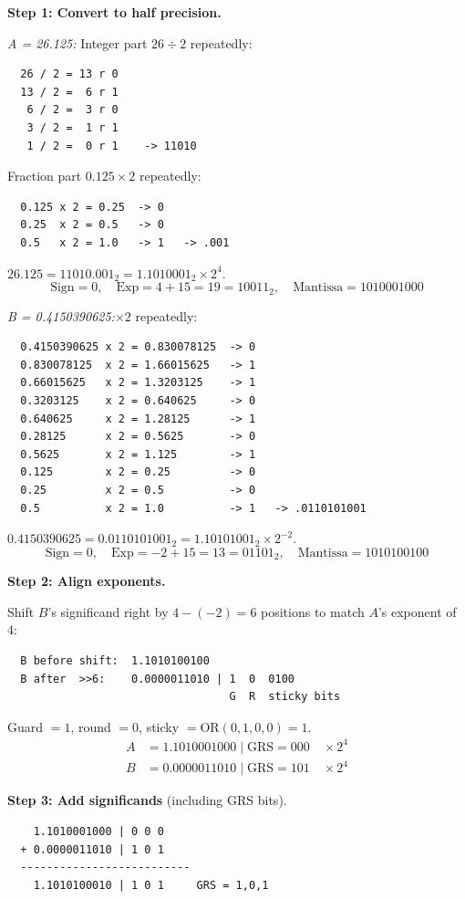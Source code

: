 \noindent\textbf{Step 1: Convert to half precision.}

\textit{A = 26.125:}\quad
Integer part $26 \div 2$ repeatedly:
\begin{verbatim}
  26 / 2 = 13 r 0
  13 / 2 =  6 r 1
   6 / 2 =  3 r 0
   3 / 2 =  1 r 1
   1 / 2 =  0 r 1    -> 11010
\end{verbatim}
\vspace{-6pt}
Fraction part $0.125 \times 2$ repeatedly:
\begin{verbatim}
  0.125 x 2 = 0.25  -> 0
  0.25  x 2 = 0.5   -> 0
  0.5   x 2 = 1.0   -> 1   -> .001
\end{verbatim}
\vspace{-6pt}
$26.125 = 11010.001_2 = 1.1010001_2 \times 2^4$.
\[
  \text{Sign} = 0,\quad
  \text{Exp} = 4 + 15 = 19 = 10011_2,\quad
  \text{Mantissa} = 1010001000
\]

\textit{B = 0.4150390625:}\quad $\times 2$ repeatedly:
\begin{verbatim}
  0.4150390625 x 2 = 0.830078125  -> 0
  0.830078125  x 2 = 1.66015625   -> 1
  0.66015625   x 2 = 1.3203125    -> 1
  0.3203125    x 2 = 0.640625     -> 0
  0.640625     x 2 = 1.28125      -> 1
  0.28125      x 2 = 0.5625       -> 0
  0.5625       x 2 = 1.125        -> 1
  0.125        x 2 = 0.25         -> 0
  0.25         x 2 = 0.5          -> 0
  0.5          x 2 = 1.0          -> 1   -> .0110101001
\end{verbatim}
\vspace{-6pt}
$0.4150390625 = 0.0110101001_2 = 1.10101001_2 \times 2^{-2}$.
\[
  \text{Sign} = 0,\quad
  \text{Exp} = -2 + 15 = 13 = 01101_2,\quad
  \text{Mantissa} = 1010100100
\]

\noindent\textbf{Step 2: Align exponents.}

Shift $B$'s significand right by $4 - (-2) = 6$ positions to match $A$'s
exponent of $4$:
\begin{verbatim}
  B before shift:  1.1010100100
  B after  >>6:    0.0000011010 | 1  0  0100
                                  G  R  sticky bits
\end{verbatim}
\vspace{-6pt}
Guard $= 1$, round $= 0$, sticky $= \text{OR}(0,1,0,0) = 1$.
\begin{align*}
  A &= 1.1010001000 \mid \text{GRS}=000 \quad \times 2^4 \\
  B &= 0.0000011010 \mid \text{GRS}=101 \quad \times 2^4
\end{align*}

\noindent\textbf{Step 3: Add significands} (including GRS bits).
\begin{verbatim}
    1.1010001000 | 0 0 0
  + 0.0000011010 | 1 0 1
  --------------------------
    1.1010100010 | 1 0 1     GRS = 1,0,1
\end{verbatim}

